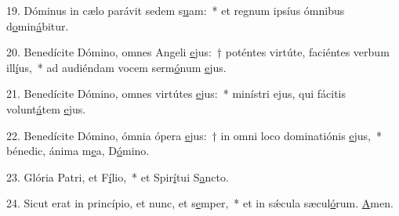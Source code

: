 19. Dóminus in cælo parávit sedem s\uline{u}am:~* et regnum ipsíus ómnibus d\uline{o}min\uline{á}bitur.\par 
20. Benedícite Dómino, omnes Angeli \uline{e}jus:~† poténtes virtúte, faciéntes verbum ill\uline{í}us,~* ad audiéndam vocem serm\uline{ó}num \uline{e}jus.\par 
21. Benedícite Dómino, omnes virtútes \uline{e}jus:~* minístri ejus, qui fácitis volunt\uline{á}tem \uline{e}jus.\par 
22. Benedícite Dómino, ómnia ópera \uline{e}jus:~† in omni loco dominatiónis \uline{e}jus,~* bénedic, ánima m\uline{e}a, D\uline{ó}mino.\par 
23. Glória Patri, et F\uline{í}lio,~* et Spir\uline{í}tui S\uline{a}ncto.\par 
24. Sicut erat in princípio, et nunc, et s\uline{e}mper,~* et in sǽcula sæcul\uline{ó}rum. \uline{A}men.\par 
